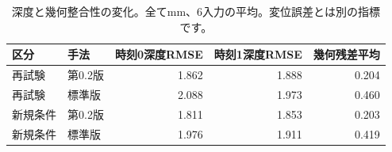 \begin{table}[H]\centering
\small
\setlength{\tabcolsep}{4pt}
\caption{深度と幾何整合性の変化。全てmm、6入力の平均。変位誤差とは別の指標です。}
\begin{tabular}{llrrr}
\toprule
区分 & 手法 & 時刻0深度RMSE & 時刻1深度RMSE & 幾何残差平均\\\midrule
再試験 & 第0.2版 & 1.862 & 1.888 & 0.204\\
再試験 & 標準版 & 2.088 & 1.973 & 0.460\\
新規条件 & 第0.2版 & 1.811 & 1.853 & 0.203\\
新規条件 & 標準版 & 1.976 & 1.911 & 0.419\\
\bottomrule
\end{tabular}
\end{table}
